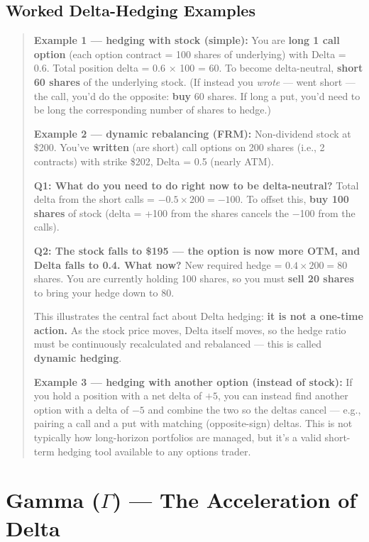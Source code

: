 \documentclass[12pt,openany]{book}
\theoremstyle{definition}
\theoremstyle{remark}
\begin{document}
\subsection{Worked Delta-Hedging Examples}

\begin{quote}
\textbf{Example 1 — hedging with stock (simple):}
You are \textbf{long 1 call option} (each option contract = 100 shares of underlying) with Delta = 0.6.
Total position delta = 0.6 × 100 = 60.
To become delta-neutral, \textbf{short 60 shares} of the underlying stock.
(If instead you \emph{wrote} — went short — the call, you'd do the opposite: \textbf{buy} 60 shares. If long a put, you'd need to be long the corresponding number of shares to hedge.)

\textbf{Example 2 — dynamic rebalancing (FRM):}
Non-dividend stock at \$200. You've \textbf{written} (are short) call options on 200 shares (i.e., 2 contracts) with strike \$202, Delta = 0.5 (nearly ATM).

\textbf{Q1: What do you need to do right now to be delta-neutral?}
Total delta from the short calls = \(-0.5 \times 200 = -100\).
To offset this, \textbf{buy 100 shares} of stock (delta = +100 from the shares cancels the −100 from the calls).

\textbf{Q2: The stock falls to \$195 — the option is now more OTM, and Delta falls to 0.4. What now?}
New required hedge = \(0.4 \times 200 = 80\) shares.
You are currently holding 100 shares, so you must \textbf{sell 20 shares} to bring your hedge down to 80.

This illustrates the central fact about Delta hedging: \textbf{it is not a one-time action.} As the stock price moves, Delta itself moves, so the hedge ratio must be continuously recalculated and rebalanced — this is called \textbf{dynamic hedging}.

\textbf{Example 3 — hedging with another option (instead of stock):}
If you hold a position with a net delta of \(+5\), you can instead find another option with a delta of \(-5\) and combine the two so the deltas cancel — e.g., pairing a call and a put with matching (opposite-sign) deltas. This is not typically how long-horizon portfolios are managed, but it's a valid short-term hedging tool available to any options trader.
\end{quote}


\section{Gamma (\texorpdfstring{\(\Gamma\)}{Gamma}) — The Acceleration of Delta}
\end{document}

